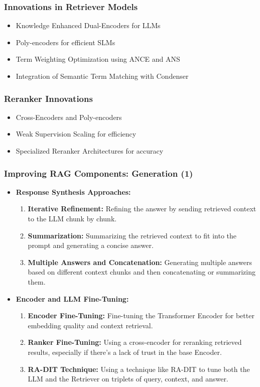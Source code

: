 \begin{frame}[fragile]\frametitle{Innovations in Retriever Models}
  \begin{itemize}
    \item Knowledge Enhanced Dual-Encoders for LLMs
    \item Poly-encoders for efficient SLMs
    \item Term Weighting Optimization using ANCE and ANS
    \item Integration of Semantic Term Matching with Condenser
  \end{itemize}
\end{frame}

\begin{frame}[fragile]\frametitle{Reranker Innovations}
  \begin{itemize}
    \item Cross-Encoders and Poly-encoders
    \item Weak Supervision Scaling for efficiency
    \item Specialized Reranker Architectures for accuracy
  \end{itemize}
\end{frame}

\begin{frame}[fragile]\frametitle{Improving RAG Components: Generation (1)}
  \begin{itemize}
    \item \textbf{Response Synthesis Approaches:}
      \begin{enumerate}
        \item \textbf{Iterative Refinement:} Refining the answer by sending retrieved context to the LLM chunk by chunk.
        \item \textbf{Summarization:} Summarizing the retrieved context to fit into the prompt and generating a concise answer.
        \item \textbf{Multiple Answers and Concatenation:} Generating multiple answers based on different context chunks and then concatenating or summarizing them.
      \end{enumerate}
    \item \textbf{Encoder and LLM Fine-Tuning:}
      \begin{enumerate}
        \item \textbf{Encoder Fine-Tuning:} Fine-tuning the Transformer Encoder for better embedding quality and context retrieval.
        \item \textbf{Ranker Fine-Tuning:} Using a cross-encoder for reranking retrieved results, especially if there's a lack of trust in the base Encoder.
        \item \textbf{RA-DIT Technique:} Using a technique like RA-DIT to tune both the LLM and the Retriever on triplets of query, context, and answer.
      \end{enumerate}
  \end{itemize}
\end{frame}

